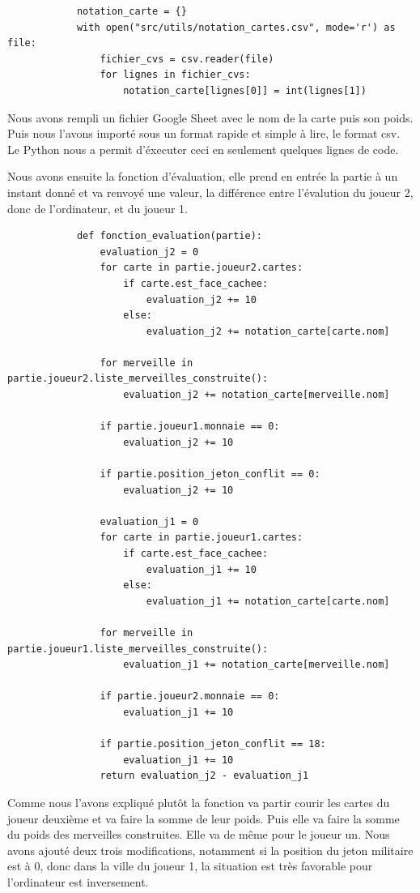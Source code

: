 \documentclass[a4paper, 12pt, french]{article}
\begin{document}
		\begin{lstlisting}
			notation_carte = {}
			with open("src/utils/notation_cartes.csv", mode='r') as file:
				fichier_cvs = csv.reader(file)
				for lignes in fichier_cvs:
					notation_carte[lignes[0]] = int(lignes[1])
		\end{lstlisting}
		
		Nous avons rempli un fichier Google Sheet avec le nom de la carte puis son poids. Puis nous l'avons importé
		sous un format rapide et simple à lire, le format csv. Le Python nous a permit d'éxecuter ceci en seulement
		quelques lignes de code.

		Nous avons ensuite la fonction d'évaluation, elle prend en entrée
		la partie à un instant donné et va renvoyé une valeur, la différence
		entre l'évalution du joueur 2, donc de l'ordinateur, et du joueur 1.

		\begin{lstlisting}
			def fonction_evaluation(partie):
				evaluation_j2 = 0
				for carte in partie.joueur2.cartes:
					if carte.est_face_cachee:
						evaluation_j2 += 10
					else:
						evaluation_j2 += notation_carte[carte.nom]
				
				for merveille in partie.joueur2.liste_merveilles_construite():
					evaluation_j2 += notation_carte[merveille.nom]
				
				if partie.joueur1.monnaie == 0:
					evaluation_j2 += 10
								
				if partie.position_jeton_conflit == 0:
					evaluation_j2 += 10
				
				evaluation_j1 = 0
				for carte in partie.joueur1.cartes:
					if carte.est_face_cachee:
						evaluation_j1 += 10
					else:
						evaluation_j1 += notation_carte[carte.nom]
				
				for merveille in partie.joueur1.liste_merveilles_construite():
					evaluation_j1 += notation_carte[merveille.nom]
				
				if partie.joueur2.monnaie == 0:
					evaluation_j1 += 10
				
				if partie.position_jeton_conflit == 18:
					evaluation_j1 += 10
				return evaluation_j2 - evaluation_j1
		\end{lstlisting}

		Comme nous l'avons expliqué plutôt la fonction va partir courir les cartes du joueur deuxième
		et va faire la somme de leur poids. Puis elle va faire
		la somme du poids des merveilles construites. Elle va de même pour le joueur un.
		Nous avons ajouté deux trois modifications, notamment si la position du jeton militaire
		est à 0, donc dans la ville du joueur 1, la situation est très favorable pour l'ordinateur
		est inversement.
\end{document}
